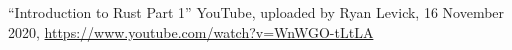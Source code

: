 \begin{thebibliography}{9}
	``Introduction to Rust Part 1'' YouTube, uploaded by Ryan Levick, 16 November 2020, \url{https://www.youtube.com/watch?v=WnWGO-tLtLA}
\end{thebibliography} 